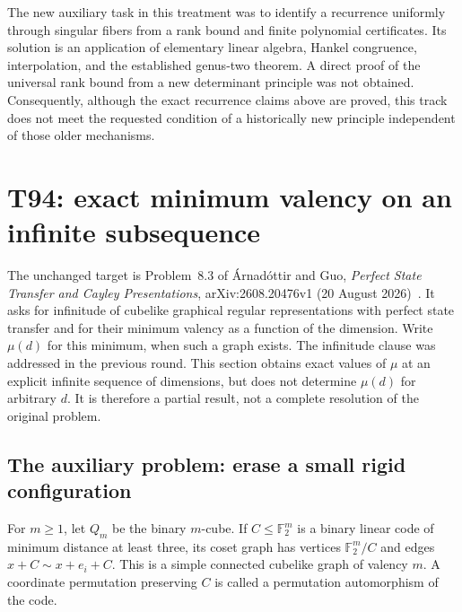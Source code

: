 \documentclass[11pt,a4paper]{article}
\theoremstyle{definition}
\theoremstyle{remark}
\begin{document}
The new auxiliary task in this treatment was to identify a recurrence
uniformly through singular fibers from a rank bound and finite polynomial
certificates. Its solution is an application of elementary linear algebra,
Hankel congruence, interpolation, and the established genus-two theorem.
A direct proof of the universal rank bound from a new determinant
principle was not obtained. Consequently, although the exact recurrence
claims above are proved, this track does not meet the requested condition
of a historically new principle independent of those older mechanisms.


\section{T94: exact minimum valency on an infinite subsequence}

The unchanged target is Problem~8.3 of \'{A}rnad\'ottir and Guo,
\emph{Perfect State Transfer and Cayley Presentations},
arXiv:2608.20476v1 (20 August 2026)~\cite{retry:arna}. It asks for infinitude of cubelike
graphical regular representations with perfect state transfer and for their
minimum valency as a function of the dimension. Write $\mu(d)$ for this
minimum, when such a graph exists. The infinitude clause was addressed in
the previous round. This section obtains exact values of $\mu$ at an
explicit infinite sequence of dimensions, but does not determine $\mu(d)$
for arbitrary $d$. It is therefore a partial result, not a complete
resolution of the original problem.

\subsection{The auxiliary problem: erase a small rigid configuration}

For $m\ge1$, let $Q_m$ be the binary $m$-cube. If
$C\le\mathbb F_2^m$ is a binary linear code of minimum distance at least
three, its coset graph has vertices $\mathbb F_2^m/C$ and edges
$x+C\sim x+e_i+C$. This is a simple connected cubelike graph of valency
$m$. A coordinate permutation preserving $C$ is called a permutation
automorphism of the code.
\end{document}
